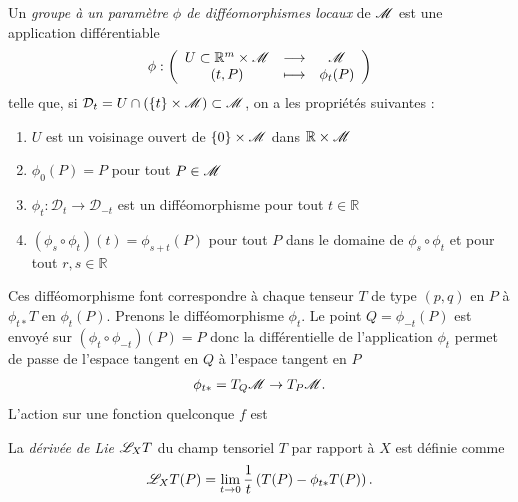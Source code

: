 \documentclass[a4paper,11pt]{report}
\begin{document}
            \begin{definition}
                Un \textit{groupe à un paramètre $\phi$ de difféomorphismes locaux} de $\mathscr{M}$ est une application différentiable
                \begin{equation}
                \phi:\left(
                \begin{array}{ccc}
                    U\subset\mathbb{R}^m\times\mathscr{M} & \longrightarrow & \mathscr{M} \\
                    (t,P) & \longmapsto & \phi_t(P)
                \end{array}
                \right)
                \end{equation}
                telle que, si $\mathcal{D}_t=U\cap(\{t\}\times\mathscr{M})\subset\mathscr{M}$, on a les propriétés suivantes :
                \begin{enumerate}[label = \textit{\roman*)}]
                    \item $U$ est un voisinage ouvert de $\{0\}\times\mathscr{M}$ dans $\mathbb{R}\times\mathscr{M}$
                    \item $\phi_0(P)=P$ pour tout $P\in\mathscr{M}$
                    \item $\phi_t:\mathcal{D}_t\to\mathcal{D}_{-t}$ est un difféomorphisme pour tout $t\in\mathbb{R}$
                    \item $(\phi_s\circ\phi_t)(t) = \phi_{s+t}(P)$ pour tout $P$ dans le domaine de $\phi_s\circ\phi_t$ et pour tout $r,s\in\mathbb{R}$
                \end{enumerate}
            \end{definition}
            
            Ces difféomorphisme font correspondre à chaque tenseur $T$ de type $(p,q)$ en $P$ à $\phi_{t*}T$ en $\phi_t(P)$. Prenons le difféomorphisme $\phi_t$. Le point $Q = \phi_{-t}(P)$ est envoyé sur $(\phi_{t}\circ\phi_{-t})(P) = P$ donc la différentielle de l'application $\phi_t$ permet de passe de l'espace tangent en $Q$ à l'espace tangent en $P$
            \begin{equation}
                \phi_{t*}=T_Q\mathscr{M}\to T_P\mathscr{M}.
            \end{equation}
            L'action sur une fonction quelconque $f$ est 
            
            \comp
            
            \begin{definition}
                La \textit{dérivée de Lie} $\mathscr{L}_X T$ du champ tensoriel $T$ par rapport à $X$ est définie comme
                \begin{equation}
                    \mathscr{L}_X T (P) = \lim\limits_{t\to0} \frac{1}{t}\left(T(P)-\phi_{t*}T(P) \right).
                \end{equation}
            \end{definition}
            
\end{document}
